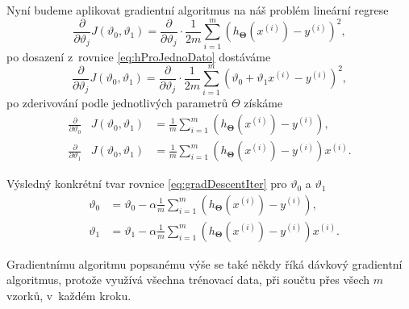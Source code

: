 \par{Nyní budeme aplikovat gradientní algoritmus na náš problém lineární regrese
\begin{equation}
	\frac{\partial}{\partial \vartheta_j} J \left( \vartheta_0, \vartheta_1 \right) = \frac{\partial}{\partial \vartheta_j} \cdot \frac{1}{2m} \sum_{i = 1}^{m} \left( h_{\bm{\Theta}} \left( x^{\left( i \right)} \right) - y^{\left( i \right)} \right)^2,
\end{equation}
po dosazení z~rovnice \ref{eq:hProJednoDato} dostáváme
\begin{equation}
	\frac{\partial}{\partial \vartheta_j} J \left( \vartheta_0, \vartheta_1 \right) = \frac{\partial}{\partial \vartheta_j} \cdot \frac{1}{2m} \sum_{i = 1}^{m} \left( \vartheta_0 + \vartheta_1  x^{\left( i \right)} - y^{\left( i \right)} \right)^2,
\end{equation}
po zderivování podle jednotlivých parametrů $\Theta$ získáme
\begin{eqnarray}
	\frac{\partial}{\partial \vartheta_0} &J \left( \vartheta_0, \vartheta_1 \right) &= \frac{1}{m} \sum_{i = 1}^{m} \left( h_{\bm{\Theta}} \left( x^{\left( i \right)} \right) - y^{\left( i \right)} \right),\\
	\frac{\partial}{\partial \vartheta_1} &J \left( \vartheta_0, \vartheta_1 \right) &= \frac{1}{m} \sum_{i = 1}^{m} \left( h_{\bm{\Theta}} \left( x^{\left( i \right)} \right) - y^{\left( i \right)} \right) x^{\left( i \right)}.
\end{eqnarray}}

\par{Výsledný konkrétní tvar rovnice \ref{eq:gradDescentIter} pro $\vartheta_0$ a $\vartheta_1$
\begin{eqnarray}
		&\vartheta_0 &= \vartheta_0 - \alpha \frac{1}{m} \sum_{i = 1}^{m} \left( h_{\bm{\Theta}} \left( x^{\left( i \right)} \right) - y^{\left( i \right)} \right),\\
		&\vartheta_1 &= \vartheta_1 - \alpha \frac{1}{m} \sum_{i = 1}^{m} \left( h_{\bm{\Theta}} \left( x^{\left( i \right)} \right) - y^{\left( i \right)} \right) x^{\left( i \right)}.
\end{eqnarray}}

\par{Gradientnímu algoritmu popsanému výše se také někdy říká dávkový gradientní algoritmus, protože využívá všechna trénovací data, při součtu přes všech $m$ vzorků, v~každém kroku.}

